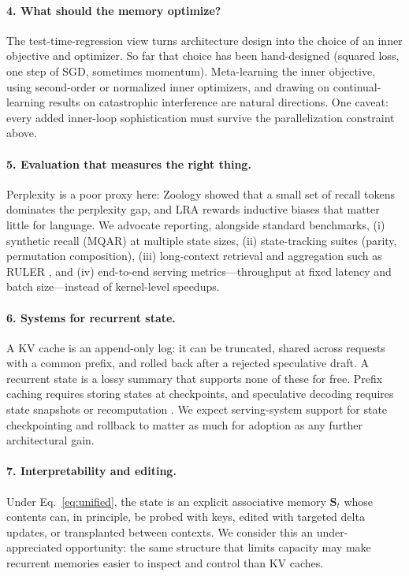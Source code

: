 \documentclass[a4paper]{article}
\newcommand{\mS}{\mathbf{S}}
\theoremstyle{plain}
\theoremstyle{remark}
\begin{document}
\paragraph{4. What should the memory optimize?} The test-time-regression view turns architecture design into the choice of an inner objective and optimizer. So far that choice has been hand-designed (squared loss, one step of SGD, sometimes momentum). Meta-learning the inner objective, using second-order or normalized inner optimizers, and drawing on continual-learning results on catastrophic interference are natural directions. One caveat: every added inner-loop sophistication must survive the parallelization constraint above.

\paragraph{5. Evaluation that measures the right thing.} Perplexity is a poor proxy here: Zoology showed that a small set of recall tokens dominates the perplexity gap, and LRA rewards inductive biases that matter little for language. We advocate reporting, alongside standard benchmarks, (i) synthetic recall (MQAR) at multiple state sizes, (ii) state-tracking suites (parity, permutation composition), (iii) long-context retrieval and aggregation such as RULER \citep{hsieh2024ruler}, and (iv) end-to-end serving metrics---throughput at fixed latency and batch size---instead of kernel-level speedups.

\paragraph{6. Systems for recurrent state.} A KV cache is an append-only log: it can be truncated, shared across requests with a common prefix, and rolled back after a rejected speculative draft. A recurrent state is a lossy summary that supports none of these for free. Prefix caching requires storing states at checkpoints, and speculative decoding requires state snapshots or recomputation \citep{wang2024mambainllama}. We expect serving-system support for state checkpointing and rollback to matter as much for adoption as any further architectural gain.

\paragraph{7. Interpretability and editing.} Under Eq.~\eqref{eq:unified}, the state is an explicit associative memory $\mS_t$ whose contents can, in principle, be probed with keys, edited with targeted delta updates, or transplanted between contexts. We consider this an under-appreciated opportunity: the same structure that limits capacity may make recurrent memories easier to inspect and control than KV caches.
\end{document}

